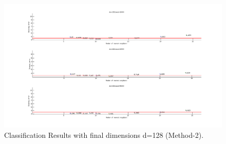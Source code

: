 \newpage
\begin{figure}[t!]
\centering
\includegraphics[width=\textwidth]{figs/9.png}
\newline
\caption{ \textlatin{Classification Results with final dimensions d=128 (Method-2)}.} 
\end{figure}

